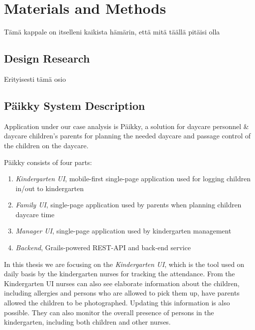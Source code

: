
\chapter{Materials and Methods}
Tämä kappale on itselleni kaikista hämärin, että mitä täällä pitäisi olla


\section{Design Research}
Erityisesti tämä osio



\section{Päikky System Description}

Application under our case analysis is Päikky, a solution for daycare personnel & daycare children’s parents for planning the needed daycare and passage control of the children on the daycare. 

Päikky consists of four parts:

\begin{enumerate}
	\item \textit{Kindergarten UI}, mobile-first single-page application used for logging children in/out to kindergarten
	\item \textit{Family UI}, single-page application used by parents when planning children daycare time
	\item \textit{Manager UI}, single-page application used by kindergarten management 
	\item \textit{Backend}, Grails-powered REST-API and back-end service
\end{enumerate}

\noindent In this thesis we are focusing on the \textit{Kindergarten UI}, which is the tool used on daily basis by the kindergarten nurses for tracking the attendance. From the Kindergarten UI nurses can also see elaborate information about the children, including allergies and persons who are allowed to pick them up, have parents allowed the children to be photographed. Updating this information is also possible. They can also monitor the overall presence of persons in the kindergarten, including both children and other nurses.

